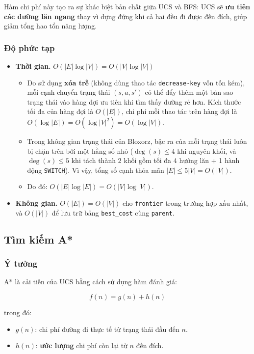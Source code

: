 Hàm chi phí này tạo ra sự khác biệt bản chất giữa UCS và BFS: UCS sẽ \textbf{ưu tiên các đường lăn ngang} thay vì dựng đứng khi cả hai đều đi được đến đích, giúp giảm tổng hao tổn năng lượng.

\subsubsection{Độ phức tạp}

\begin{itemize}
\item \textbf{Thời gian.} $O(|E| \log |V|) = O(|V| \log |V|)$
\begin{itemize}
\item Do sử dụng \textbf{xóa trễ} (không dùng thao tác \texttt{decrease-key} vốn tốn kém), mỗi cạnh chuyển trạng thái $(s, a, s')$ có thể đẩy thêm một bản sao trạng thái vào hàng đợi ưu tiên khi tìm thấy đường rẻ hơn. Kích thước tối đa của hàng đợi là $O(|E|)$, chi phí mỗi thao tác trên hàng đợi là $O(\log |E|) = O(\log |V|^2) = O(\log |V|)$.
\item Trong không gian trạng thái của Bloxorz, bậc ra của mỗi trạng thái luôn bị chặn trên bởi một hằng số nhỏ ($\deg(s) \le 4$ khi nguyên khối, và $\deg(s) \le 5$ khi tách thành 2 khối gồm tối đa 4 hướng lăn + 1 hành động \texttt{SWITCH}). Vì vậy, tổng số cạnh thỏa mãn $|E| \le 5|V| = O(|V|)$.
\item Do đó: $O(|E| \log |E|) = O(|V| \log |V|)$.
\end{itemize}
\item \textbf{Không gian.} $O(|E|) = O(|V|)$ cho \texttt{frontier} trong trường hợp xấu nhất, và $O(|V|)$ để lưu trữ bảng \texttt{best\_\allowbreak{}cost} cùng \texttt{parent}.
\end{itemize}

\subsection{Tìm kiếm A*}

\subsubsection{Ý tưởng}

A* là cải tiến của UCS bằng cách sử dụng hàm đánh giá:

\[f(n) = g(n) + h(n)\]

trong đó:

\begin{itemize}
\item $g(n)$: chi phí đường đi thực tế từ trạng thái đầu đến $n$.
\item $h(n)$: \textbf{ước lượng} chi phí còn lại từ $n$ đến đích.
\end{itemize}

